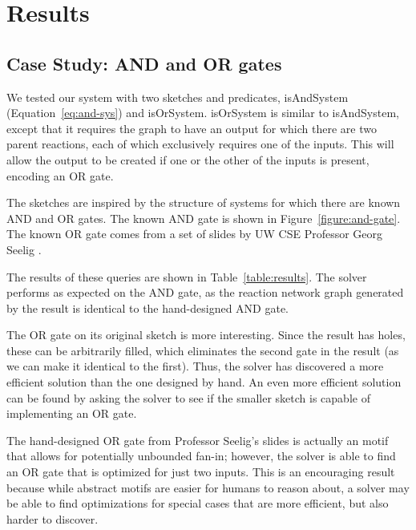 \documentclass{article}
\begin{document}
\section{Results}

\subsection{Case Study: AND and OR gates}

We tested our system with two sketches and predicates, isAndSystem 
(Equation~\ref{eq:and-sys}) and isOrSystem. isOrSystem is similar
to isAndSystem, except that it requires the graph to have an output
for which there are two parent reactions, each of which exclusively
requires one of the inputs. This will allow the output to be created
if one or the other of the inputs is present, encoding an OR gate.

The sketches are inspired by the structure of systems for which
there are known AND and OR gates. The known AND gate is shown in
Figure~\ref{figure:and-gate}. The known OR gate comes from
a set of slides by UW CSE Professor Georg Seelig \cite{seelig}.

The results of these queries are shown in Table~\ref{table:results}.
The solver performs as expected on the AND gate, as the reaction network
graph generated by the result is identical to the hand-designed AND gate.

The OR gate on its original sketch is more interesting. Since the result has
holes, these can be arbitrarily filled, which eliminates the second gate in the
result (as we can make it identical to the first). Thus, the solver has
discovered a more efficient solution than the one designed by hand.
An even more efficient solution can be found by asking the solver to
see if the smaller sketch is capable of implementing an OR gate.

The hand-designed OR gate from Professor Seelig's slides is actually an motif
that allows for potentially unbounded fan-in; however, the solver
is able to find an OR gate that is optimized for just two inputs. This
is an encouraging result because while abstract motifs are easier for
humans to reason about, a solver may be able to find optimizations
for special cases that are more efficient, but also harder to discover.
\end{document}
